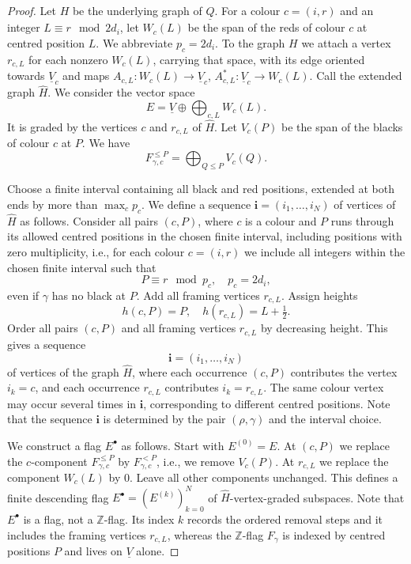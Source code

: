 \documentclass[11pt,reqno]{amsart}
\theoremstyle{definition}
\theoremstyle{remark}
\def\bbZ{\mathbb Z}
\def\dV{\underline V}
\def\dQ{\underline Q}
\begin{document}
\begin{proof}
Let $H$ be the underlying graph of $\dQ$.
For a colour \(c=(i,r)\) and an integer \(L\equiv r\mod{2d_i}\), 
let \(W_c(L)\) be the span of the reds of colour \(c\) at centred position \(L\).
We abbreviate $p_c=2d_i$.
To the graph $H$  we attach a vertex $r_{c,L}$ for each
nonzero $W_c(L)$, carrying that space, with its edge oriented towards
$\dV_c$ and maps $A_{c,L}:W_c(L)\to\dV_c$,  $A^*_{c,L}:\dV_c\to W_c(L)$. 
Call the extended graph $\widehat H$. 
We consider the vector space 
$$E=\dV\oplus\bigoplus_{c,L}W_c(L).$$ 
It is graded by the vertices
$c$ and $r_{c,L}$ of $\widehat H$. Let $V_c(P)$ be the span of the
blacks of colour $c$ at $P$. We have
$$F_{\gamma,c}^{\leqslant P}=\bigoplus_{Q\leqslant P}V_c(Q).$$


Choose a finite interval containing all black and red positions,
extended at both ends by more than $\max_c p_c$. 
We define a  sequence \(\mathbf i=(i_1,\ldots,i_N)\) of vertices of $\widehat H$ as follows.
Consider all pairs \((c,P)\), where \(c\) is a colour and \(P\) runs 
through its allowed centred positions in the chosen finite interval, including positions with zero multiplicity, i.e.,
for each colour \(c=(i,r)\) we include all integers within the chosen finite interval such that
\[
P\equiv r\mod{p_c},\quad p_c=2d_i,
\]
even if \(\gamma\) has no black at \(P\).
Add all framing vertices \(r_{c,L}\).
Assign heights
\[
h(c,P)=P,\quad h(r_{c,L})=L+\tfrac12.
\]
Order all pairs \((c,P)\) and all framing vertices \(r_{c,L}\) by decreasing height. 
This gives a sequence $$\mathbf i=(i_1,\ldots,i_N)$$ of vertices of the graph \(\widehat H\), 
where each occurrence \((c,P)\) contributes the vertex \(i_k=c\), 
and each occurrence \(r_{c,L}\) contributes \(i_k=r_{c,L}\). 
The same colour vertex may occur several times in \(\mathbf i\), corresponding to different centred positions.
Note that the sequence \(\mathbf i\) is determined by the pair \((\rho,\gamma)\) and the interval choice.



We construct a flag $E^\bullet$ as follows.
Start with $E^{(0)}=E$. At $(c,P)$ we replace the $c$-component
$F_{\gamma,c}^{\leqslant P}$ by $F_{\gamma,c}^{<P}$, i.e., we remove
$V_c(P)$. At $r_{c,L}$ we replace the component $W_c(L)$ by $0$.
Leave all other components unchanged. This defines a finite descending
flag $E^\bullet=(E^{(k)})_{k=0}^N$ of $\widehat H$-vertex-graded
subspaces. Note that $E^\bullet$ is a flag, not a $\mathbb Z$-flag. 
Its index $k$ records the ordered removal steps and it includes the
framing vertices $r_{c,L}$, whereas
the $\bbZ$-flag $F_\gamma$ is indexed by centred positions $P$ and
lives on $\dV$ alone. 


\end{proof}
\end{document}
